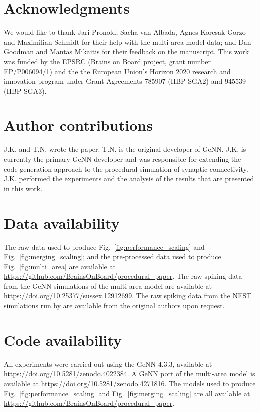 \documentclass[9pt,a4paper]{amsart}
\begin{document}
\section{Acknowledgments}
We would like to thank Jari Pronold, Sacha van Albada, Agnes Korcsak-Gorzo and Maximilian Schmidt for their help with the multi-area model data; and Dan Goodman and Mantas Mikaitis for their feedback on the manuscript.
This work was funded by the EPSRC (Brains on Board project, grant number EP/P006094/1) and the the European Union’s Horizon 2020 research and innovation program under Grant Agreements 785907 (HBP SGA2) and 945539 (HBP SGA3).

\section{Author contributions}
J.K. and T.N. wrote the paper.
T.N. is the original developer of GeNN.
J.K. is currently the primary GeNN developer and was responsible for extending the code generation approach to the procedural simulation of synaptic connectivity.
J.K. performed the experiments and the analysis of the results that are presented in this work.

\section{Data availability}
The raw data used to produce Fig.~\ref{fig:performance_scaling} and Fig.~\ref{fig:merging_scaling}; and the pre-processed data used to produce Fig.~\ref{fig:multi_area} are available at \url{https://github.com/BrainsOnBoard/procedural_paper}.
The raw spiking data from the GeNN simulations of the multi-area model are available at \url{https://doi.org/10.25377/sussex.12912699}.
The raw spiking data from the NEST simulations run by \citet{Schmidt2018} are available from the original authors upon request.

\section{Code availability}
All experiments were carried out using the GeNN 4.3.3, available at \url{https://doi.org/10.5281/zenodo.4022384}.
A GeNN port of the multi-area model is available at \url{https://doi.org/10.5281/zenodo.4271816}.
The models used to produce Fig.~\ref{fig:performance_scaling} and Fig.~\ref{fig:merging_scaling} are all available at \url{https://github.com/BrainsOnBoard/procedural_paper}.



\end{document}
